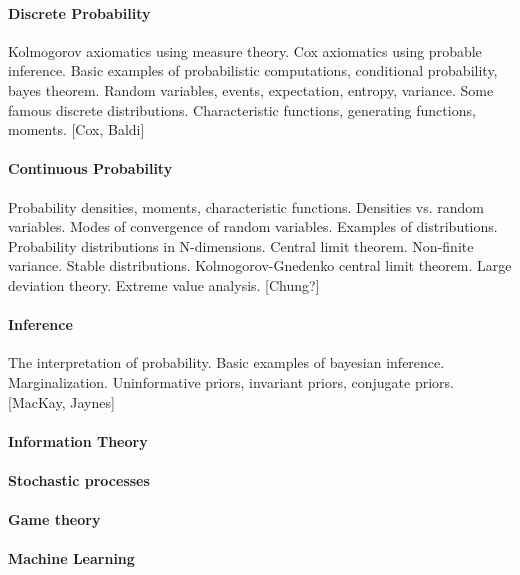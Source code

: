 \paragraph{Discrete Probability}
Kolmogorov axiomatics using measure theory.
Cox axiomatics using probable inference.
Basic examples of probabilistic computations, conditional probability, bayes
theorem.
Random variables, events, expectation, entropy, variance.
Some famous discrete distributions.
Characteristic functions, generating functions, moments.
[Cox, Baldi]

\paragraph{Continuous Probability}
Probability densities, moments, characteristic functions.
Densities vs. random variables.
Modes of convergence of random variables.
Examples of distributions.
Probability distributions in N-dimensions.
Central limit theorem.
Non-finite variance.  Stable distributions.  Kolmogorov-Gnedenko central
limit theorem.
Large deviation theory.
Extreme value analysis.
[Chung?]


\paragraph{Inference}
The interpretation of probability.
Basic examples of bayesian inference.
Marginalization.
Uninformative priors, invariant priors, conjugate priors.
[MacKay, Jaynes]



\paragraph{Information Theory}

\paragraph{Stochastic processes}

\paragraph{Game theory}

\paragraph{Machine Learning}



